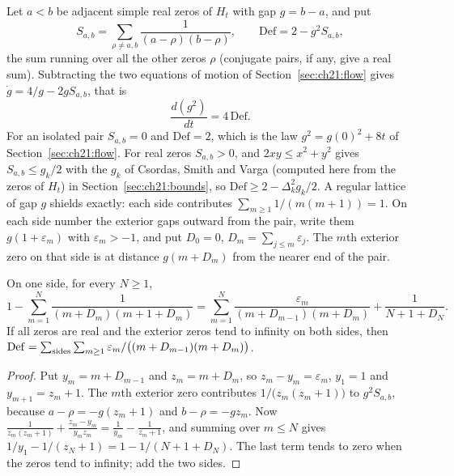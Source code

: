 Let $a<b$ be adjacent simple real zeros of $H_t$ with gap $g=b-a$, and put
\[
S_{a,b}=\sum_{\rho\ne a,b}\frac1{(a-\rho)(b-\rho)},\qquad \mathrm{Def}=2-g^2S_{a,b},
\]
the sum running over all the other zeros $\rho$ (conjugate pairs, if any, give a real sum). Subtracting the two equations of motion of Section~\ref{sec:ch21:flow} gives $\dot g=4/g-2gS_{a,b}$, that is
\begin{equation}\label{nw:eq:gap}
\frac{d(g^2)}{dt}=4\,\mathrm{Def}.
\end{equation}
For an isolated pair $S_{a,b}=0$ and $\mathrm{Def}=2$, which is the law $g^2=g(0)^2+8t$ of Section~\ref{sec:ch21:flow}. For real zeros $S_{a,b}>0$, and $2xy\le x^2+y^2$ gives $S_{a,b}\le g_k/2$ with the $g_k$ of Csordas, Smith and Varga (computed here from the zeros of $H_t$) in Section~\ref{sec:ch21:bounds}, so $\mathrm{Def}\ge2-\Delta_k^2g_k/2$. A regular lattice of gap $g$ shields exactly: each side contributes $\sum_{m\ge1}1/(m(m+1))=1$. On each side number the exterior gaps outward from the pair, write them $g(1+\varepsilon_m)$ with $\varepsilon_m>-1$, and put $D_0=0$, $D_m=\sum_{j\le m}\varepsilon_j$. The $m$th exterior zero on that side is at distance $g(m+D_m)$ from the nearer end of the pair.

\begin{theorem}[Newton]\label{nw:thm:shield}
On one side, for every $N\ge1$,
\[
1-\sum_{m=1}^N\frac1{(m+D_m)(m+1+D_m)}=\sum_{m=1}^N\frac{\varepsilon_m}{(m+D_{m-1})(m+D_m)}+\frac1{N+1+D_N}.
\]
If all zeros are real and the exterior zeros tend to infinity on both sides, then $\mathrm{Def}=\sum_{\rm sides}\sum_{m\ge1}\varepsilon_m/\bigl((m+D_{m-1})(m+D_m)\bigr)$.
\end{theorem}

\begin{proof}
Put $y_m=m+D_{m-1}$ and $z_m=m+D_m$, so $z_m-y_m=\varepsilon_m$, $y_1=1$ and $y_{m+1}=z_m+1$. The $m$th exterior zero contributes $1/\bigl(z_m(z_m+1)\bigr)$ to $g^2S_{a,b}$, because $a-\rho=-g(z_m+1)$ and $b-\rho=-gz_m$. Now $\frac1{z_m(z_m+1)}+\frac{z_m-y_m}{y_mz_m}=\frac1{y_m}-\frac1{z_m+1}$, and summing over $m\le N$ gives $1/y_1-1/(z_N+1)=1-1/(N+1+D_N)$. The last term tends to zero when the zeros tend to infinity; add the two sides.
\end{proof}

